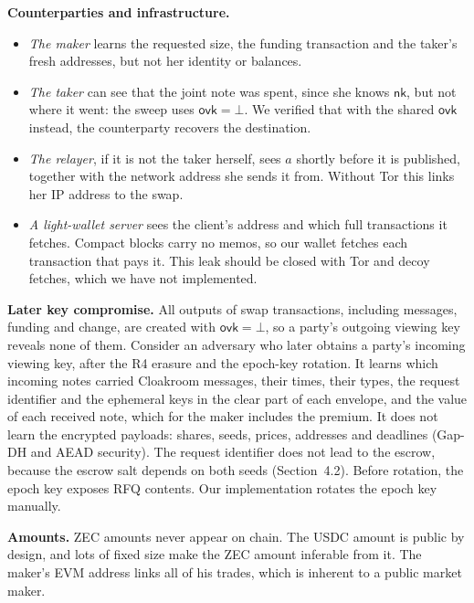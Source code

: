 \documentclass[10pt,letterpaper]{article}
\theoremstyle{plain}
\theoremstyle{definition}
\newcommand{\nk}{\mathsf{nk}}
\newcommand{\ovk}{\mathsf{ovk}}
\begin{document}
\textbf{Counterparties and infrastructure.}
\begin{itemize}\setlength\itemsep{0.05em}
\item \emph{The maker} learns the requested size, the funding transaction and the taker's fresh
addresses, but not her identity or balances.
\item \emph{The taker} can see that the joint note was spent, since she knows $\nk$, but not where
it went: the sweep uses $\ovk=\bot$. We verified that with the shared $\ovk$ instead, the
counterparty recovers the destination.
\item \emph{The relayer}, if it is not the taker herself, sees $a$ shortly before it is
published, together with the network address she sends it from. Without Tor this links her IP
address to the swap.
\item \emph{A light-wallet server} sees the client's address and which full transactions it
fetches. Compact blocks carry no memos, so our wallet fetches each transaction that pays it.
This leak should be closed with Tor and decoy fetches, which we have not implemented.
\end{itemize}

\textbf{Later key compromise.} All outputs of swap transactions, including messages, funding and
change, are created with $\ovk=\bot$, so a party's outgoing viewing key reveals none of them.
Consider an adversary who later obtains a party's incoming viewing key, after the R4 erasure and
the epoch-key rotation. It learns which incoming notes carried Cloakroom messages, their times,
their types, the request identifier and the ephemeral keys in the clear part of each envelope, and
the value of each received note, which for the maker includes the premium. It does not learn the
encrypted payloads: shares, seeds, prices, addresses and deadlines (Gap-DH and AEAD security). The
request identifier does not lead to the escrow, because the escrow salt depends on both seeds
(Section~4.2). Before rotation, the epoch key exposes RFQ contents. Our implementation rotates the
epoch key manually.

\textbf{Amounts.} ZEC amounts never appear on chain. The USDC amount is public by design, and lots
of fixed size make the ZEC amount inferable from it. The maker's EVM address links all of his
trades, which is inherent to a public market maker.
\end{document}
